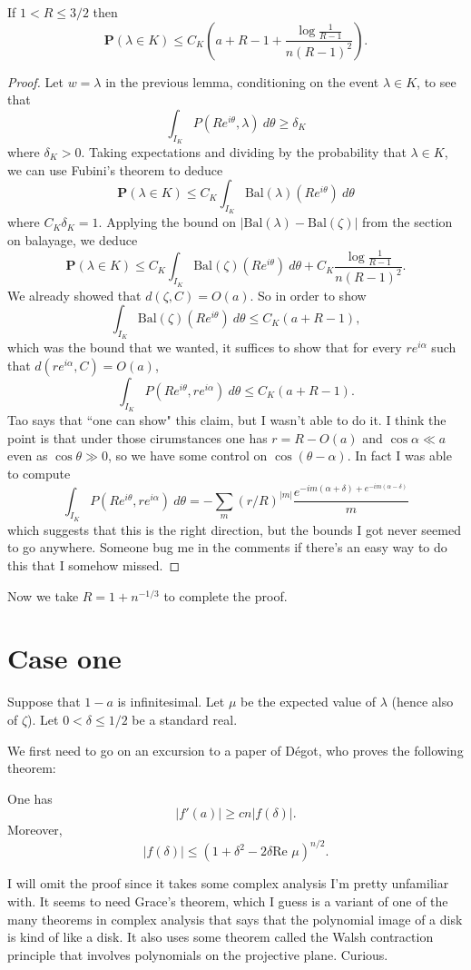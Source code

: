 \documentclass[12pt]{article}
\begin{document}
\begin{lemma}
If $1 < R \leq 3/2$ then
$$\mathbf P(\lambda \in K) \leq C_K\left(a + R - 1 + \frac{\log \frac{1}{R - 1}}{n(R-1)^2} \right).$$
\end{lemma}
\begin{proof}
Let $w = \lambda$ in the previous lemma, conditioning on the event $\lambda \in K$, to see that
$$\int_{I_K} P(Re^{i\theta}, \lambda) ~d\theta \geq \delta_K$$
where $\delta_K > 0$.
Taking expectations and dividing by the probability that $\lambda \in K$, we can use Fubini's theorem to deduce
$$\mathbf P(\lambda \in K) \leq C_K \int_{I_K} \text{Bal}(\lambda)(Re^{i\theta}) ~d\theta$$
where $C_K\delta_K = 1$.
Applying the bound on $|\text{Bal}(\lambda) - \text{Bal}(\zeta)|$ from the section on balayage, we deduce
$$\mathbf P(\lambda \in K) \leq C_K \int_{I_K} \text{Bal}(\zeta)(Re^{i\theta}) ~d\theta + C_K\frac{\log\frac{1}{R-1}}{n(R-1)^2}.$$
We already showed that $d(\zeta, C) = O(a)$.
So in order to show
$$\int_{I_K} \text{Bal}(\zeta)(Re^{i\theta}) ~d\theta \leq C_K(a + R - 1),$$
which was the bound that we wanted,
it suffices to show that for every $re^{i\alpha}$ such that $d(re^{i\alpha}, C) = O(a)$,
$$\int_{I_K} P(Re^{i\theta}, re^{i\alpha}) ~d\theta \leq C_K(a + R - 1).$$
Tao says that ``one can show" this claim, but I wasn't able to do it.
I think the point is that under those cirumstances one has $r = R - O(a)$ and $\cos \alpha \ll a$ even as $\cos \theta \gg 0$, so we have some control on $\cos(\theta - \alpha)$. In fact I was able to compute
$$\int_{I_K} P(Re^{i\theta}, re^{i\alpha}) ~d\theta = -\sum_m (r/R)^{|m|}\frac{e^{-im(\alpha + \delta) + e^{-im(\alpha - \delta)}}}{m}$$
which suggests that this is the right direction, but the bounds I got never seemed to go anywhere.
Someone bug me in the comments if there's an easy way to do this that I somehow missed.
\end{proof}

Now we take $R = 1 + n^{-1/3}$ to complete the proof.

\section{Case one}
Suppose that $1 - a$ is infinitesimal.
Let $\mu$ be the expected value of $\lambda$ (hence also of $\zeta$).
Let $0 < \delta \leq 1/2$ be a standard real.

We first need to go on an excursion to a paper of D\'egot, who proves the following theorem:
\begin{lemma}
One has
$$|f'(a)| \geq cn |f(\delta)|.$$
Moreover,
$$|f(\delta)| \leq (1 + \delta^2 - 2\delta \text{Re }\mu)^{n/2}.$$
\end{lemma}
I will omit the proof since it takes some complex analysis I'm pretty unfamiliar with. It seems to need Grace's theorem, which I guess is a variant of one of the many theorems in complex analysis that says that the polynomial image of a disk is kind of like a disk.
It also uses some theorem called the Walsh contraction principle that involves polynomials on the projective plane.
Curious.
\end{document}
